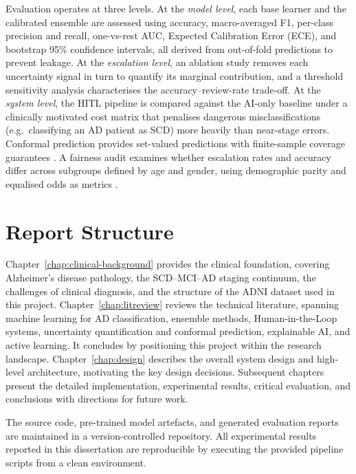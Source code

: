 \documentclass[12pt, a4paper]{report}
\begin{document}
  Evaluation operates at three levels. At the \emph{model level}, each base learner
  and the calibrated ensemble are assessed using accuracy, macro-averaged F1, per-class
  precision and recall, one-vs-rest AUC, Expected Calibration Error (ECE), and
  bootstrap 95\% confidence intervals, all derived from out-of-fold predictions to
  prevent leakage. At the \emph{escalation level}, an ablation study removes each
  uncertainty signal in turn to quantify its marginal contribution, and a threshold
  sensitivity analysis characterises the accuracy--review-rate trade-off. At the
  \emph{system level}, the HITL pipeline is compared against the AI-only baseline
  under a clinically motivated cost matrix that penalises dangerous misclassifications
  (e.g.\ classifying an AD patient as SCD) more heavily than near-stage errors.
  Conformal prediction provides set-valued predictions with finite-sample
  coverage guarantees \citep{angelopoulos2023conformal}. A fairness audit examines
  whether escalation rates and accuracy differ across subgroups defined by age and
  gender, using demographic parity and equalised odds as metrics
  \citep{mehrabi2021survey}.

  \section{Report Structure}
  \label{sec:structure}

  Chapter~\ref{chap:clinical-background} provides the clinical foundation, covering
  Alzheimer's disease pathology, the SCD--MCI--AD staging continuum, the challenges
  of clinical diagnosis, and the structure of the ADNI dataset used in this project.
  Chapter~\ref{chap:litreview} reviews the technical literature, spanning machine
  learning for AD classification, ensemble methods, Human-in-the-Loop systems,
  uncertainty quantification and conformal prediction, explainable AI, and active
  learning. It concludes by positioning this project within the research landscape.
  Chapter~\ref{chap:design} describes the overall system design and high-level
  architecture, motivating the key design decisions. Subsequent chapters present the
  detailed implementation, experimental results, critical evaluation, and conclusions
  with directions for future work.

  The source code, pre-trained model artefacts, and generated evaluation reports are
  maintained in a version-controlled repository. All experimental results reported
  in this dissertation are reproducible by executing the provided pipeline scripts
  from a clean environment.
\end{document}
